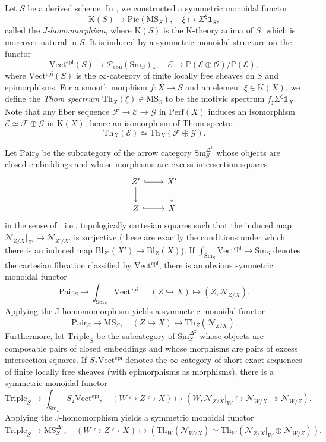 \documentclass{amsart}
\numberwithin{equation}{section}
\theoremstyle{plain}
\theoremstyle{definition}
\let\scr=\mathcal
\let\bb=\mathbb
\def\P{\bb P}
\def\1{\mathbf 1}
\let\into=\hookrightarrow
\let\onto=\twoheadrightarrow
\def\Th{\mathrm{Th}}
\def\Pic{\mathrm{Pic}}
\def\Bl{\mathrm{Bl}}
\let\cat=\mathrm
\def\K{\mathrm{K}{}}
\def\Sm{{\cat{S}\mathrm{m}}}
\def\Vect{\cat{V}\mathrm{ect}{}}
\def\Pair{\mathrm{Pair}}
\def\MS{\mathrm{MS}}
\def\Perf{\mathrm{Perf}{}}
\def\epi{\mathrm{epi}}
\def\ebu{\mathrm{ebu}}
\begin{document}
Let $S$ be a derived scheme.
In \cite[Section 7]{AHI}, we constructed a symmetric monoidal functor
\[
\K(S)\to \Pic(\MS_S),\quad \xi\mapsto \Sigma^{\xi}\1_S,
\]
called the \emph{J-homomorphism}, where $\K(S)$ is the K-theory anima of $S$, which is moreover natural in $S$. It is induced by a symmetric monoidal structure on the functor
\[
\Vect^\epi(S)\to \scr P_\ebu(\Sm_S)_*,\quad \scr E\mapsto \P(\scr E\oplus\scr O)/\P(\scr E),
\]
where $\Vect^\epi(S)$ is the $\infty$-category of finite locally free sheaves on $S$ and epimorphisms.
For a smooth morphism $f\colon X\to S$ and an element $\xi\in \K(X)$, we define the \emph{Thom spectrum} $\Th_X(\xi)\in\MS_S$ to be the motivic spectrum $f_\sharp\Sigma^\xi\1_X$. 
Note that any fiber sequence $\scr F\to\scr E\to\scr G$ in $\Perf(X)$ induces an isomorphism $\scr E\simeq \scr F\oplus\scr G$ in $\K(X)$, hence an isomorphism of Thom spectra
\[
\Th_X(\scr E)\simeq \Th_X(\scr F\oplus\scr G).
\]

Let $\Pair_S$ be the subcategory of the arrow category $\Sm_S^{\Delta^1}$ whose objects are closed embeddings and whose morphisms are excess intersection squares
\[
\begin{tikzcd}
Z' \arrow[hook]{r} \arrow[d] & X' \arrow[d]\\
Z \arrow[hook]{r} & X
\end{tikzcd}
\]
in the sense of \cite[Introduction]{KhanExcess}, i.e., topologically cartesian squares such that the induced map $\scr N_{Z/X} \vert_{Z'} \to \scr N_{Z'/X'}$ is surjective (these are exactly the conditions under which there is an induced map $\Bl_{Z'}(X')\to\Bl_Z(X)$). 
If $\int_{\Sm_S}\Vect^\epi\to\Sm_S$ denotes the cartesian fibration classified by $\Vect^\epi$, there is an obvious symmetric monoidal functor
\[
\Pair_S \to \int_{\Sm_S}\Vect^{\mathrm{epi}},\quad (Z\into X)\mapsto (Z,\scr N_{Z/X}).
\]
Applying the J-homomomorphism yields a symmetric monoidal functor
\begin{equation}\label{eqn:Th-Pair}
\Pair_S\to \MS_S,\quad (Z\into X)\mapsto \Th_Z(\scr N_{Z/X}).
\end{equation}
Furthermore, let $\mathrm{Triple}_S$ be the subcategory of $\Sm_S^{\Delta^2}$ whose objects are composable pairs of closed embeddings and whose morphisms are pairs of excess intersection squares. 
If $S_2\Vect^\epi$ denotes the $\infty$-category of short exact sequences of finite locally free sheaves (with epimorphisms as morphisms), there is a symmetric monoidal functor
\[
\mathrm{Triple}_S \to \int_{\Sm_S}S_2\Vect^\epi,\quad (W\into Z\into X) \mapsto (W,\scr N_{Z/X}|_W\into \scr N_{W/X}\onto\scr N_{W/Z}).
\]
Applying the J-homomorphism yields a symmetric monoidal functor
\begin{equation}\label{eqn:Th-Triple}
\mathrm{Triple}_S \to \MS_S^{\Delta^1},\quad (W\into Z\into X) \mapsto (\Th_W(\scr N_{W/X})\simeq \Th_W(\scr N_{Z/X}|_W\oplus \scr N_{W/Z})).
\end{equation}
\end{document}
